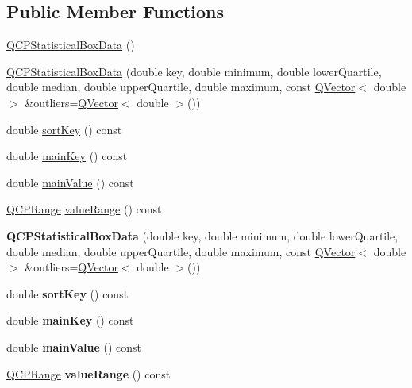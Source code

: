 \subsection*{Public Member Functions}
\begin{DoxyCompactItemize}
\item 
\hyperlink{class_q_c_p_statistical_box_data_ab96c4b93670a8dcac8a3d4080fd722ee}{Q\+C\+P\+Statistical\+Box\+Data} ()
\item 
\hyperlink{class_q_c_p_statistical_box_data_a66b0c6d39765d0feb49c286fba4e4ef5}{Q\+C\+P\+Statistical\+Box\+Data} (double key, double minimum, double lower\+Quartile, double median, double upper\+Quartile, double maximum, const \hyperlink{class_q_vector}{Q\+Vector}$<$ double $>$ \&outliers=\hyperlink{class_q_vector}{Q\+Vector}$<$ double $>$())
\item 
double \hyperlink{class_q_c_p_statistical_box_data_ad00ab8d43ec89a40ec7ee7ca154a2b0e}{sort\+Key} () const 
\item 
double \hyperlink{class_q_c_p_statistical_box_data_ae0f68c5e61909838e7e85618a6c72019}{main\+Key} () const 
\item 
double \hyperlink{class_q_c_p_statistical_box_data_a1c90d779c2ddf6d96da5384fd8121645}{main\+Value} () const 
\item 
\hyperlink{class_q_c_p_range}{Q\+C\+P\+Range} \hyperlink{class_q_c_p_statistical_box_data_abe311ba7ba785215f791db23498f702f}{value\+Range} () const 
\item 
{\bfseries Q\+C\+P\+Statistical\+Box\+Data} (double key, double minimum, double lower\+Quartile, double median, double upper\+Quartile, double maximum, const \hyperlink{class_q_vector}{Q\+Vector}$<$ double $>$ \&outliers=\hyperlink{class_q_vector}{Q\+Vector}$<$ double $>$())\hypertarget{class_q_c_p_statistical_box_data_a66b0c6d39765d0feb49c286fba4e4ef5}{}\label{class_q_c_p_statistical_box_data_a66b0c6d39765d0feb49c286fba4e4ef5}

\item 
double {\bfseries sort\+Key} () const \hypertarget{class_q_c_p_statistical_box_data_ad00ab8d43ec89a40ec7ee7ca154a2b0e}{}\label{class_q_c_p_statistical_box_data_ad00ab8d43ec89a40ec7ee7ca154a2b0e}

\item 
double {\bfseries main\+Key} () const \hypertarget{class_q_c_p_statistical_box_data_ae0f68c5e61909838e7e85618a6c72019}{}\label{class_q_c_p_statistical_box_data_ae0f68c5e61909838e7e85618a6c72019}

\item 
double {\bfseries main\+Value} () const \hypertarget{class_q_c_p_statistical_box_data_a1c90d779c2ddf6d96da5384fd8121645}{}\label{class_q_c_p_statistical_box_data_a1c90d779c2ddf6d96da5384fd8121645}

\item 
\hyperlink{class_q_c_p_range}{Q\+C\+P\+Range} {\bfseries value\+Range} () const \hypertarget{class_q_c_p_statistical_box_data_abe311ba7ba785215f791db23498f702f}{}\label{class_q_c_p_statistical_box_data_abe311ba7ba785215f791db23498f702f}

\end{DoxyCompactItemize}
